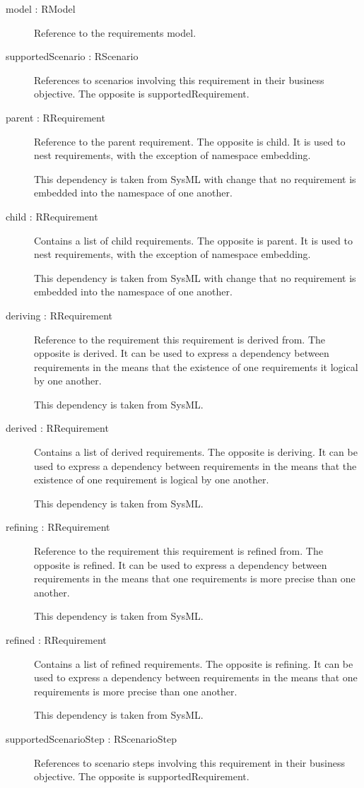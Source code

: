 \begin{description}
	\item[model : RModel] Reference to the requirements model.
	\item[supportedScenario : RScenario] References to scenarios involving this requirement in their business objective.
The opposite is supportedRequirement.
	\item[parent : RRequirement] Reference to the parent requirement. The opposite is child.
It is used to nest requirements, with the exception of namespace embedding.

This dependency is taken from SysML with change that no requirement is embedded into the namespace of one another.
	\item[child : RRequirement] Contains a list of child requirements. The opposite is parent.
It is used to nest requirements, with the exception of namespace embedding.

This dependency is taken from SysML with change that no requirement is embedded into the namespace of one another.
	\item[deriving : RRequirement] Reference to the requirement this requirement is derived from. The opposite is derived.
It can be used to express a dependency between requirements in the means that the existence of one requirements it logical by one another.

This dependency is taken from SysML.
	\item[derived : RRequirement] Contains a list of derived requirements. The opposite is deriving.
It can be used to express a dependency between requirements in the means that the existence of one requirement is logical by one another.

This dependency is taken from SysML.
	\item[refining : RRequirement] Reference to the requirement this requirement is refined from. The opposite is refined.
It can be used to express a dependency between requirements in the means that one requirements is more precise than one another.

This dependency is taken from SysML.
	\item[refined : RRequirement] Contains a list of refined requirements. The opposite is refining.
It can be used to express a dependency between requirements in the means that one requirements is more precise than one another.

This dependency is taken from SysML.
	\item[supportedScenarioStep : RScenarioStep] References to scenario steps involving this requirement in their business objective.
The opposite is supportedRequirement.
\end{description}

